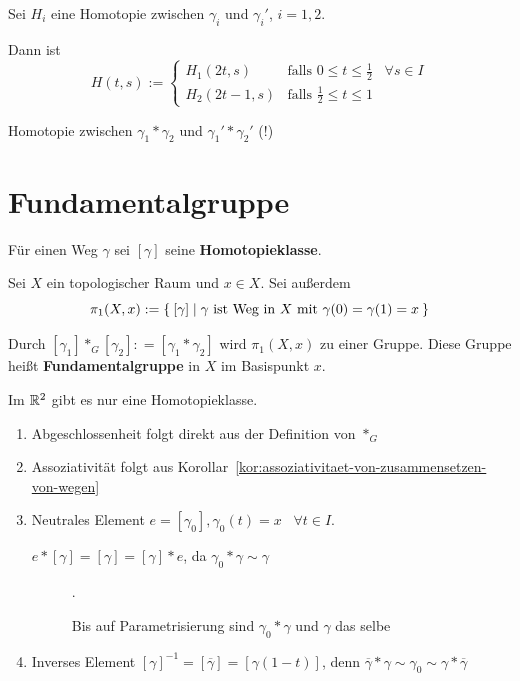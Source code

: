 \begin{beweis}
    Sei $H_i$ eine Homotopie zwischen $\gamma_i$ und $\gamma_i'$,
    $i=1,2$.

    Dann ist 
    \[H(t,s) := \begin{cases}
        H_1(2t, s)  &\text{falls } 0 \leq t \leq \frac{1}{2}\;\;\;\forall s \in I\\
        H_2(2t-1,s) &\text{falls } \frac{1}{2} \leq t \leq 1
    \end{cases}\]

    Homotopie zwischen $\gamma_1 * \gamma_2$ und $\gamma_1' * \gamma_2 '$ (!)
\end{beweis}

\section{Fundamentalgruppe}
Für einen Weg $\gamma$ sei $[\gamma]$ seine \textbf{Homotopieklasse}.

\begin{definition}
    Sei $X$ ein topologischer Raum und $x \in X$. Sei außerdem
    \[\pi_1(X,x) := \Set{[\gamma] | \gamma \text{ ist Weg in } X \text{ mit } \gamma(0) = \gamma(1) = x}\]

    Durch $[\gamma_1] *_G [\gamma_2] : = [\gamma_1 * \gamma_2]$ wird
    $\pi_1(X,x)$ zu einer Gruppe. Diese Gruppe heißt \textbf{Fundamentalgruppe}
    in $X$ im Basispunkt $x$.
\end{definition}

\begin{bemerkung}
    Im $\mathbb{R}^2$ gibt es nur eine Homotopieklasse.
\end{bemerkung}

\begin{beweis}\leavevmode
    \begin{enumerate}[label=\alph*)]
        \item Abgeschlossenheit folgt direkt aus der Definition von $*_G$
        \item Assoziativität folgt aus Korollar~\ref{kor:assoziativitaet-von-zusammensetzen-von-wegen}
        \item Neutrales Element $e = [\gamma_0], \gamma_0(t) = x \;\;\; \forall t \in I$.

        $e * [\gamma] = [\gamma] = [\gamma] * e$, da $\gamma_0 * \gamma \sim \gamma$

        \begin{figure}
            \centering
            
            \caption{Bis auf Parametrisierung sind $\gamma_0 * \gamma$ und $\gamma$ das selbe}.
            \label{fig:weg-zusammengesetzt-mit-neutralem-weg}
        \end{figure}
        \item Inverses Element  $[\gamma]^{-1} = [\overline{\gamma}] = [\gamma(1-t)]$, 
            denn $\overline{\gamma} * \gamma \sim \gamma_0 \sim \gamma * \overline{\gamma}$
    \end{enumerate}
\end{beweis}

